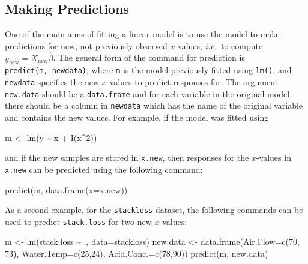 \documentclass[
  a4paper,
]{article}
\newenvironment{Shaded}{\begin{snugshade}}{\end{snugshade}}
\newcommand{\AttributeTok}[1]{\textcolor[rgb]{0.77,0.63,0.00}{#1}}
\newcommand{\DecValTok}[1]{\textcolor[rgb]{0.00,0.00,0.81}{#1}}
\newcommand{\FunctionTok}[1]{\textcolor[rgb]{0.00,0.00,0.00}{#1}}
\newcommand{\NormalTok}[1]{#1}
\newcommand{\OtherTok}[1]{\textcolor[rgb]{0.56,0.35,0.01}{#1}}
\newcommand{\SpecialCharTok}[1]{\textcolor[rgb]{0.00,0.00,0.00}{#1}}
\theoremstyle{definition}
\theoremstyle{definition}
\theoremstyle{definition}
\theoremstyle{definition}
\theoremstyle{remark}
\begin{document}
\hypertarget{lm-predict}{%
\subsection*{Making Predictions}\label{lm-predict}}

One of the main aims of fitting a linear model is to use the model to make
predictions for new, not previously observed \(x\)-values, \emph{i.e.}~to compute
\(y_{\mathrm{new}} = X_{\mathrm{new}} \hat\beta\). The general form of the
command for prediction is \texttt{predict(m,\ newdata)}, where \texttt{m} is the model
previously fitted using \texttt{lm()}, and \texttt{newdata} specifies the new \(x\)-values to
predict responses for. The argument \texttt{new.data} should be a \texttt{data.frame} and
for each variable in the original model there should be a column in \texttt{newdata}
which has the name of the original variable and contains the new values. For
example, if the model was fitted using

\begin{Shaded}
\begin{Highlighting}[]
\NormalTok{  m }\OtherTok{\textless{}{-}} \FunctionTok{lm}\NormalTok{(y }\SpecialCharTok{\textasciitilde{}}\NormalTok{ x }\SpecialCharTok{+} \FunctionTok{I}\NormalTok{(x}\SpecialCharTok{\^{}}\DecValTok{2}\NormalTok{))}
\end{Highlighting}
\end{Shaded}

and if the new samples are stored in \texttt{x.new}, then responses for
the \(x\)-values in \texttt{x.new} can be predicted using the following
command:

\begin{Shaded}
\begin{Highlighting}[]
  \FunctionTok{predict}\NormalTok{(m, }\FunctionTok{data.frame}\NormalTok{(}\AttributeTok{x=}\NormalTok{x.new))}
\end{Highlighting}
\end{Shaded}

As a second example, for the \texttt{stackloss} dataset, the following
commands can be used to predict \texttt{stack.loss} for two new
\(x\)-values:

\begin{Shaded}
\begin{Highlighting}[]
\NormalTok{  m }\OtherTok{\textless{}{-}} \FunctionTok{lm}\NormalTok{(stack.loss }\SpecialCharTok{\textasciitilde{}}\NormalTok{ ., }\AttributeTok{data=}\NormalTok{stackloss)}
\NormalTok{  new.data }\OtherTok{\textless{}{-}} \FunctionTok{data.frame}\NormalTok{(}\AttributeTok{Air.Flow=}\FunctionTok{c}\NormalTok{(}\DecValTok{70}\NormalTok{, }\DecValTok{73}\NormalTok{), }\AttributeTok{Water.Temp=}\FunctionTok{c}\NormalTok{(}\DecValTok{25}\NormalTok{,}\DecValTok{24}\NormalTok{), }\AttributeTok{Acid.Conc.=}\FunctionTok{c}\NormalTok{(}\DecValTok{78}\NormalTok{,}\DecValTok{90}\NormalTok{))}
  \FunctionTok{predict}\NormalTok{(m, new.data)}
\end{Highlighting}
\end{Shaded}
\end{document}
